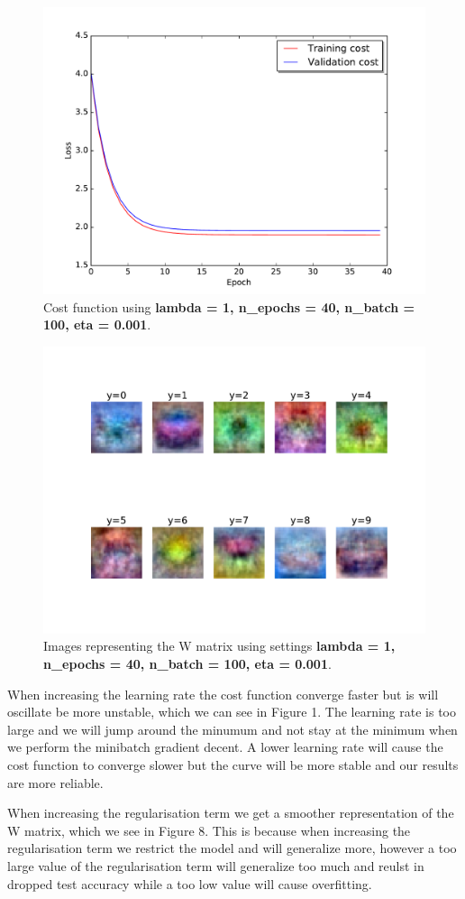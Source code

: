 \documentclass{article}
\begin{document}
\begin{figure}[H]
\centering
  \includegraphics[width = 12cm]{../Result_pics/fourthCost2.pdf}
\caption{Cost function using \textbf{lambda = 1, n\_epochs = 40, n\_batch = 100, eta = 0.001}. }
\label{fig:fourthCost}
\end{figure}

\begin{figure}[H]
\centering
  \includegraphics[width = 12cm]{../Result_pics/fourthW2.pdf}
\caption{Images representing the W matrix using settings \textbf{lambda = 1, n\_epochs = 40, n\_batch = 100, eta = 0.001}.}
\label{fig:fourthW}
\end{figure}


When increasing the learning rate the cost function converge faster but is will oscillate be more 
unstable, which we can see in Figure 1. The learning rate is too large and we will jump around the minumum 
and not stay at the minimum when we perform the minibatch gradient decent. 
A lower learning rate will cause the cost function to converge slower but the curve will be more stable and our results 
are more reliable. 

When increasing the regularisation term we get a smoother representation of the W matrix, which we see in Figure 8. 
This is because when increasing the regularisation term we restrict the model and will generalize more, however a too 
large value of the regularisation term will generalize too much and reulst in dropped test accuracy while a too low value 
will cause overfitting. 
\end{document}
